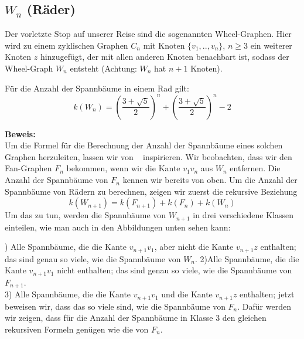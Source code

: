 \subsection{$W_n$ (Räder)}
Der vorletzte Stop auf unserer Reise sind die sogenannten Wheel-Graphen. Hier wird zu einem zyklischen Graphen $C_n$ mit Knoten $\{v_1,..,v_n\}$, $n \geq 3$ ein weiterer Knoten $z$ hinzugefügt, der mit allen anderen Knoten benachbart ist, sodass der Wheel-Graph $W_{n}$ entsteht (Achtung: $W_n$ hat $n+1$ Knoten).
\begin{Tm}
Für die Anzahl der Spannbäume in einem Rad gilt:
\begin{equation}
 \mathit{k}(W_n) = (\frac{3+\sqrt{5}}{2})^n+(\frac{3+\sqrt{5}}{2})^n-2
 \label{wn}
\end{equation}
\end{Tm}
\textbf{Beweis:}\\
Um die Formel für die Berechnung der Anzahl der Spannbäume eines solchen Graphen herzuleiten, lassen wir von ~\cite{sedlacek_1970} inspirieren.
Wir beobachten, dass wir den Fan-Graphen $F_n$ bekommen, wenn wir die Kante $v_1v_n$ aus $W_n$ entfernen.
Die Anzahl der Spannbäume von $F_n$ kennen wir bereits von oben.
Um die Anzahl der Spannbäume von Rädern zu berechnen, zeigen wir zuerst die rekursive Beziehung
\begin{equation}
 \mathit{k}(W_{n+1}) = \mathit{k}(F_{n+1}) + \mathit{k}(F_n) + \mathit{k}(W_n)
\end{equation}
Um das zu tun, werden die Spannbäume von $W_{n+1}$ in drei verschiedene Klassen einteilen, wie man auch in den Abbildungen unten sehen kann:\\
\par %
\begingroup
\leftskip=20pt%
\rightskip=20pt
) Alle Spannbäume, die die Kante $v_{n+1}v_1$, aber nicht die Kante $v_{n+1}z$ enthalten; das sind genau so viele, wie die Spannbäume von $W_n$.
2)Alle Spannbäume, die die Kante $v_{n+1}v_1$ nicht enthalten; das sind genau so viele, wie die Spannbäume von $F_{n+1}$.\\
3) Alle Spannbäume, die die Kante $v_{n+1}v_1$ und die Kante $v_{n+1}z$ enthalten; jetzt beweisen wir, dass das so viele sind, wie die Spannbäume von $F_n$.
Dafür werden wir zeigen, dass für die Anzahl der Spannbäume in Klasse $3$ den gleichen rekursiven Formeln genügen wie die von $F_n$.
\par
\endgroup
{}

